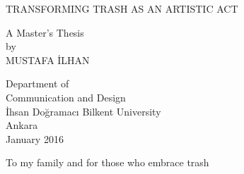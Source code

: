 \documentclass[12pt]{report}
\begin{document}


\begin{titlepage}
    \begin{center}
        
        \singlespacing
        
        \vspace*{25mm}
        \uppercase{Transforming Trash as an Artistic Act}
        
        \vspace{15mm}
        A Master’s Thesis\\
        \vspace{15mm}
        by\\
        MUSTAFA İLHAN
        
        \vfill
        Department of\\
        Communication and Design\\
        İhsan Doğramacı Bilkent University\\
        Ankara\\
        January 2016
        \vspace{25mm}
        
    \end{center}
\end{titlepage}


\clearpage
\afterpage{\null\newpage}
\clearpage


\newenvironment{dedication}
  {\clearpage           %
   \thispagestyle{empty}%
   \vspace*{2in}		%
   \centering
  }
  {\par					%
   \vfill
   \clearpage           %
  }

\begin{dedication}
To my family and for those who embrace trash
\end{dedication}

\end{document}

